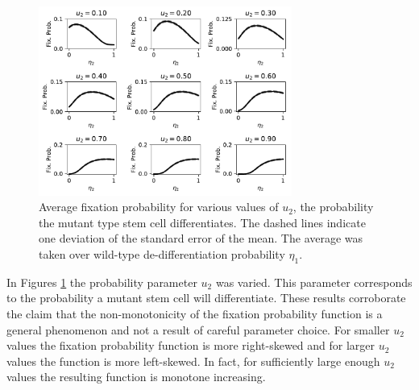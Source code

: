\documentclass[12pt]{article}
\begin{document}
\begin{figure}[H]
\begin{center}
\includegraphics[width=0.74\textwidth]{avg_eta1_u2_stackplot.pdf}
\end{center}
\caption{Average fixation probability for various values of $u_2$, the probability the mutant type stem cell differentiates. The dashed lines indicate one deviation of the standard error of the mean. The average was taken over wild-type de-differentiation probability $\eta_1$.}\label{u2_stack}
\end{figure}

In Figures \ref{u2_stack} the probability parameter $u_2$ was varied. This parameter corresponds to the probability a mutant stem cell will differentiate. These results corroborate the claim that the non-monotonicity of the fixation probability function is a general phenomenon and not a result of careful parameter choice. For smaller $u_2$ values the fixation probability function is more right-skewed and for larger $u_2$ values the function is more left-skewed. In fact, for sufficiently large enough $u_2$ values the resulting function is monotone increasing. 
\end{document}
